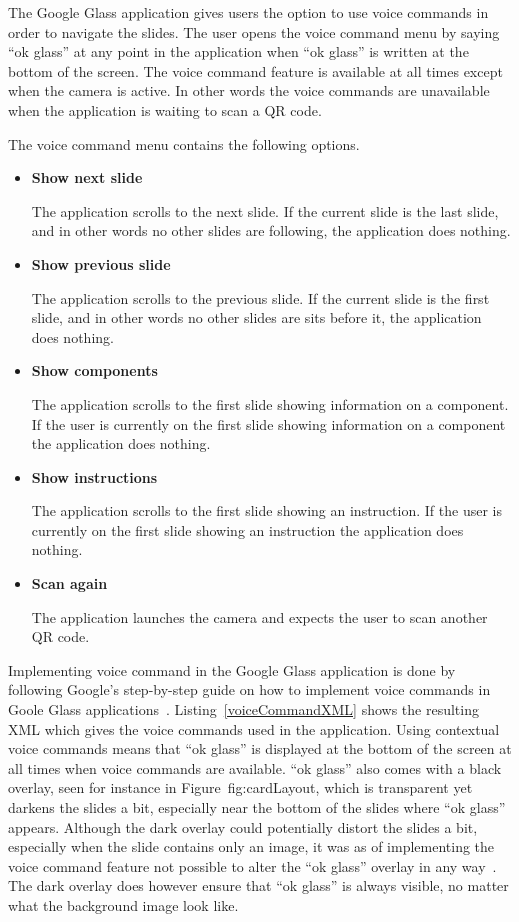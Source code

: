 The Google Glass application gives users the option to use voice commands in order to navigate the slides. The user opens the voice command menu by saying ``ok glass'' at any point in the application when ``ok glass'' is written at the bottom of the screen. The voice command feature is available at all times except when the camera is active. In other words the voice commands are unavailable when the application is waiting to scan a QR code.

The voice command menu contains the following options.

\begin{itemize}
	\item \textbf{Show next slide}
	
	The application scrolls to the next slide. If the current slide is the last slide, and in other words no other slides are following, the application does nothing.
	\item \textbf{Show previous slide}
	
	The application scrolls to the previous slide. If the current slide is the first slide, and in other words no other slides are sits before it, the application does nothing.
	\item \textbf{Show components}
	
	The application scrolls to the first slide showing information on a component. If the user is currently on the first slide showing information on a component the application does nothing. 
	\item \textbf{Show instructions}
	
	The application scrolls to the first slide showing an instruction. If the user is currently on the first slide showing an instruction the application does nothing.
	\item \textbf{Scan again}
	
	The application launches the camera and expects the user to scan another QR code.
\end{itemize}

Implementing voice command in the Google Glass application is done by following Google's step-by-step guide on how to implement voice commands in Goole Glass applications~\cite{howToVoiceInput}. Listing~\ref{voiceCommandXML} shows the resulting XML which gives the voice commands used in the application. Using contextual voice commands means that ``ok glass'' is displayed at the bottom of the screen at all times when voice commands are available. ``ok glass'' also comes with a black overlay, seen for instance in Figure~{fig:cardLayout}, which is transparent yet darkens the slides a bit, especially near the bottom of the slides where ``ok glass'' appears. Although the dark overlay could potentially distort the slides a bit, especially when the slide contains only an image, it was as of implementing the voice command feature not possible to alter the ``ok glass'' overlay in any way~\cite{voiceCommandCustom1, voiceCommandCustom2}. The dark overlay does however ensure that ``ok glass'' is always visible, no matter what the background image look like.

